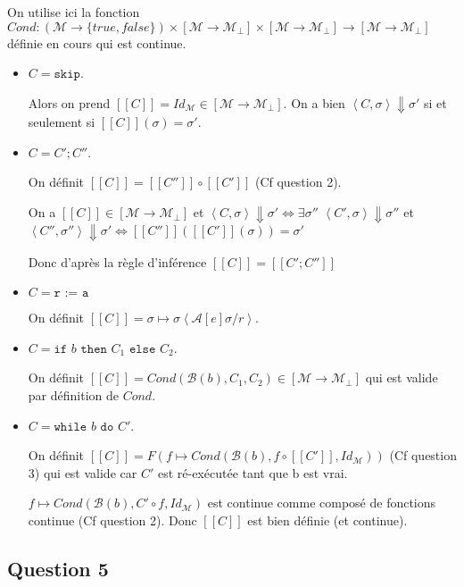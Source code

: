 \documentclass{article}
\newcommand{\M}{\mathcal{M}}
\newcommand{\Cr}[1]{[\![#1]\!]}
\newcommand{\Co}[1]{\left \langle #1 \right \rangle}
\begin{document}
On utilise ici la fonction $Cond : (\M \rightarrow \{ true, false \}) \times [\M \rightarrow \M_\bot] \times [\M \rightarrow \M_\bot] \rightarrow [\M \rightarrow \M_\bot]$ définie en cours qui est continue.

\begin{itemize}
    \item $C = \texttt{skip}$. 
    
    Alors on prend $\Cr{C} = Id_\M \in [\M \rightarrow \M_\bot]$. On a bien $\Co{C, \sigma} \Downarrow \sigma'$  si et seulement si  $\Cr{C}(\sigma) = \sigma'$.
    
    \item $C = C' ; C''$. 
    
    On définit $\Cr{C}= \Cr{C''} \circ \Cr{C'}$ (Cf question 2).
    
      On a $\Cr{C} \in [\M \rightarrow \M_\bot]$ et $\Co{C, \sigma} \Downarrow \sigma' \Leftrightarrow\exists \sigma''$ $\Co{C', \sigma} \Downarrow \sigma''$ et $\Co{C'', \sigma''} \Downarrow \sigma'\Leftrightarrow\Cr{C''}(\Cr{C'}(\sigma)) = \sigma'$ 
      
      Donc d'après la règle d'inférence $\Cr{C}=\Cr{C' ; C''}$
    
    \item $C = \texttt{r := a}$ 
    
    On définit $\Cr{C} = \sigma \mapsto \sigma\Co{\mathcal{A}[e]\sigma/r}$.
    
    \item $C = \texttt{if } b \texttt{ then } C_1 \texttt{ else } C_2$. 
    
    On définit $\Cr{C} = Cond(\mathcal{B}(b), C_1, C_2) \in [\M \rightarrow \M_\bot]$ qui est valide par définition de $Cond$.
    
    \item $C = \texttt{while } b \texttt{ do } C'$. 
    
    On définit $\Cr{C} = F(f \mapsto Cond(\mathcal{B}(b),  f\circ \Cr{C'}, Id_\M))$ (Cf question 3) qui est valide car $C'$ est ré-exécutée  tant que b est vrai.
    
      $f \mapsto Cond(\mathcal{B}(b), C' \circ f, Id_\M)$ est continue comme composé de fonctions continue (Cf question 2). Donc $\Cr{C}$ est bien définie (et continue).
\end{itemize}

\subsection*{Question 5}
\end{document}

